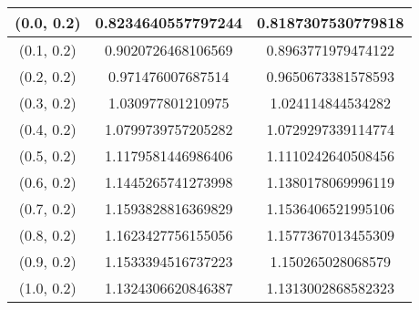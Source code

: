 \begin{table}[H]
\begin{tabular}{|c|c|c|}
(0.0, 0.2) & 0.8234640557797244 & 0.8187307530779818 \\
\hline
(0.1, 0.2) & 0.9020726468106569 & 0.8963771979474122 \\
\hline
(0.2, 0.2) & 0.971476007687514 & 0.9650673381578593 \\
\hline
(0.3, 0.2) & 1.030977801210975 & 1.024114844534282 \\
\hline
(0.4, 0.2) & 1.0799739757205282 & 1.0729297339114774 \\
\hline
(0.5, 0.2) & 1.1179581446986406 & 1.1110242640508456 \\
\hline
(0.6, 0.2) & 1.1445265741273998 & 1.1380178069996119 \\
\hline
(0.7, 0.2) & 1.1593828816369829 & 1.1536406521995106 \\
\hline
(0.8, 0.2) & 1.1623427756155056 & 1.1577367013455309 \\
\hline
(0.9, 0.2) & 1.1533394516737223 & 1.150265028068579 \\
\hline
(1.0, 0.2) & 1.1324306620846387 & 1.1313002868582323 \\
\hline
\end{tabular}
\end{table}
